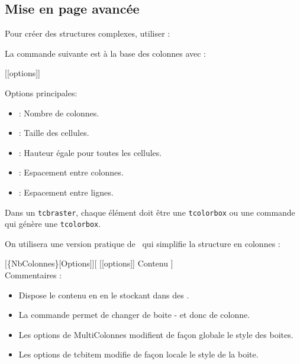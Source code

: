 \subsection{Mise en page avancée}

\begin{Methode}
    Pour créer des structures complexes, utiliser :
    \begin{tcbenumerate}[2]
        \tcbitem La commande suivante est à la base des colonnes avec  : 
        
        [[options]]

        Options principales:
        \begin{itemize}[label=$\bullet$]
            \item {} : Nombre de colonnes.
            \item {} : Taille des cellules.
            \item {} : Hauteur égale pour toutes les cellules.
            \item {} : Espacement entre colonnes.
            \item {} : Espacement entre lignes.
        \end{itemize}
        
        Dans un \texttt{tcbraster}, chaque élément doit être une \texttt{tcolorbox} ou une commande qui génère une \texttt{tcolorbox}.
        
        \tcbitem  On utilisera une version pratique de \bfcours\ qui simplifie la structure en colonnes :

        [\{NbColonnes\}[Options]][
            [[options]] Contenu
        ]\\

        Commentaires : 
        \begin{itemize}[label=$\bullet$]
            \item Dispose le contenu en  en le stockant dans des .
            \item La commande  permet de changer de boite - et donc de colonne. 
            \item Les options de MultiColonnes modifient de façon globale le style des boites. 
            \item Les options de tcbitem modifie de façon locale le style de la boite. 
        \end{itemize}

    \end{tcbenumerate}
\end{Methode}

